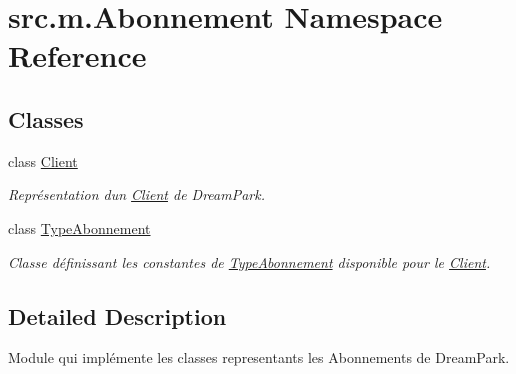 \hypertarget{namespacesrc_1_1m_1_1_abonnement}{}\section{src.\+m.\+Abonnement Namespace Reference}
\label{namespacesrc_1_1m_1_1_abonnement}
\subsection*{Classes}
\begin{DoxyCompactItemize}
\item 
class \hyperlink{classsrc_1_1m_1_1_abonnement_1_1_client}{Client}
\begin{DoxyCompactList}\small\item\em Représentation d\textquotesingle{}un \hyperlink{classsrc_1_1m_1_1_abonnement_1_1_client}{Client} de Dream\+Park. \end{DoxyCompactList}\item 
class \hyperlink{classsrc_1_1m_1_1_abonnement_1_1_type_abonnement}{Type\+Abonnement}
\begin{DoxyCompactList}\small\item\em Classe définissant les constantes de \hyperlink{classsrc_1_1m_1_1_abonnement_1_1_type_abonnement}{Type\+Abonnement} disponible pour le \hyperlink{classsrc_1_1m_1_1_abonnement_1_1_client}{Client}. \end{DoxyCompactList}\end{DoxyCompactItemize}


\subsection{Detailed Description}
\begin{DoxyVerb}    Module qui implémente les classes representants les Abonnements de DreamPark.
\end{DoxyVerb}
 